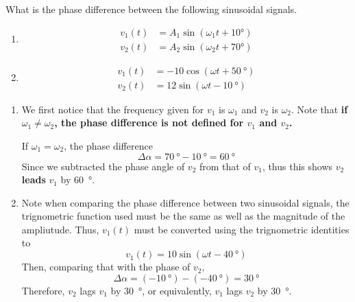 \documentclass{article}
\begin{document}
\begin{example}
    What is the phase difference between the following sinusoidal signals. 
    \begin{enumerate}
        \item \begin{align*}
            v_1(t)&=A_1\sin(\omega_1t+10\si{\degree})\\
            v_2(t)&=A_2\sin(\omega_2t+70\si{\degree})
        \end{align*}
        \item \begin{align*}
            v_1(t)&=-10\cos(\omega t+\SI{50}{\degree})\\
            v_2(t)&=12\sin(\omega t-\SI{10}{\degree})
        \end{align*}
    \end{enumerate}
\end{example}
\begin{sol}
    \begin{enumerate}
        \item We first notice that the frequency given for $v_1$ is $\omega_1$ and $v_2$ is $\omega_2$. Note that \textbf{if $\omega_1\neq\omega_2$, the phase difference is not defined for $v_1$ and $v_2$.}

        If $\omega_1=\omega_2$, the phase difference 
        \begin{equation}
            \Delta\alpha=\SI{70}{\degree}-\SI{10}{\degree}=\SI{60}{\degree}
        \end{equation}
        Since we subtracted the phase angle of $v_2$ from that of $v_1$, thus this shows $v_2$ \textbf{leads} $v_1$ by \SI{60}{\degree}.
        \begin{center}
        \end{center}
        \item Note when comparing the phase difference between two sinusoidal signals, the trignometric function used must be the same as well as the magnitude of the ampliutude. Thus, $v_1(t)$ must be converted using the trignometric identities to 
        \begin{equation}
            v_1(t)=10\sin(\omega t-\SI{40}{\degree})
        \end{equation}
        Then, comparing that with the phase of $v_2$, 
        \begin{equation}
            \Delta\alpha=(\SI{-10}{\degree})-(\SI{-40}{\degree})=\SI{30}{\degree}
        \end{equation}
        Therefore, $v_2$ lags $v_1$ by \SI{30}{\degree}, or equivalently, $v_1$ lags $v_2$ by \SI{30}{\degree}.
    \end{enumerate}
\end{sol}
\end{document}
